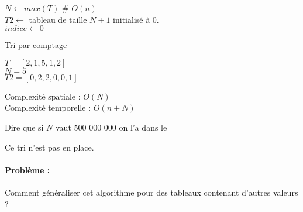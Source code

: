 
\begin{algorithm}[H]
	
	$N \gets max(T)$ \# $O(n)$\\
	$T2 \gets$ tableau de taille $N+1$ initialisé à $0$.\\
	$indice \gets 0$\\
	\caption{Tri par comptage}
\end{algorithm}

\begin{example}
	$T = [2, 1, 5, 1, 2]$\\
	$N = 5$\\
	$T2 = [0, 2, 2, 0, 0, 1]$\\
\end{example}

\begin{rem}
	Complexité spatiale : $O(N)$\\
	Complexité temporelle : $O(n+N)$\\
	\begin{com}
		Dire que si $N$ vaut 500 000 000 on l'a dans le 
	\end{com}
	Ce tri n'est pas en place.
\end{rem}


\paragraph{Problème :} Comment généraliser cet algorithme pour des tableaux contenant d'autres valeurs ?

